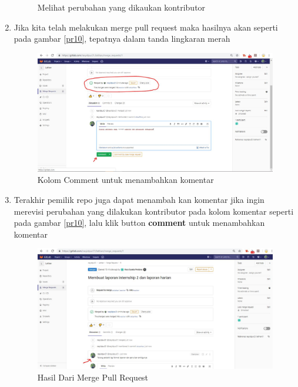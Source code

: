 \begin{enumerate}
\begin{figure}[!htbp]
\caption{Melihat perubahan yang dikaukan kontributor}
\label{fig:pr9}
\end{figure}
\item Jika kita telah melakukan merge pull request maka hasilnya akan seperti pada gambar \ref{pr10}, tepatnya dalam tanda lingkaran merah 
\subitem
\begin{figure}[!htbp]
\centerline{\includegraphics[width=.75\textwidth]{Figures/gitlab/pr10.JPG}}
\caption{Kolom Comment untuk menambahkan komentar}
\label{fig:pr10}
\end{figure}
\item Terakhir pemilik repo juga dapat menambah kan komentar jika ingin merevisi perubahan yang dilakukan kontributor pada kolom komentar seperti pada gambar \ref{pr10}, lalu klik button \textbf{comment} untuk menambahkan komentar
\subitem
\begin{figure}[!htbp]
\centerline{\includegraphics[width=.75\textwidth]{Figures/gitlab/pr11.JPG}}
\caption{Hasil Dari Merge Pull Request}
\label{fig:pr11}
\end{figure}
\end{enumerate}
